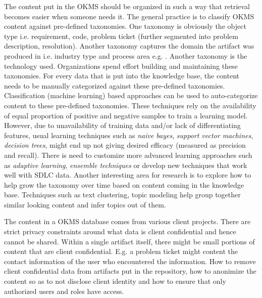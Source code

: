 The content put in the OKMS should be organized in such a way that retrieval becomes easier when someone needs it. The general practice is to classify OKMS content against pre-defined taxonomies. One taxonomy is obviously the object type i.e. requirement, code, problem ticket (further segmented into problem description, resolution). Another taxonomy captures the domain the artifact was produced in i.e. industry type and process area e.g. \cite{}. Another taxonomy is the technology used. Organizations spend effort building and maintaining these taxonomies. For every data that is put into the knowledge base, the content needs to be manually categorized against these pre-defined taxonomies. Classification (machine learning) based approaches can be used to auto-categorize content to these pre-defined taxonomies. These techniques rely on the availability of equal proportion of positive and negative samples to train a learning model. However, due to unavailability of training data and/or lack of differentiating features, usual learning techniques such as \textit{naive bayes}, \textit{support vector machines}, \textit{decision trees}, might end up not giving desired efficacy (measured as precision and recall). There is need to customize more advanced learning approaches such as \textit{adaptive learning}, \textit{ensemble techniques} or develop new techniques that work well with SDLC data. Another interesting area for research is to explore how to help grow the taxonomy over time based on content coming in the knowledge base. Techniques such as text clustering, topic modeling \cite{} help group together similar looking content and infer topics out of them. 

The content in a OKMS database comes from various client projects. There are strict privacy constraints around what data is client confidential and hence cannot be shared. Within a single artifact itself, there might be small portions of content that are client confidential. E.g. a problem ticket might content the contact information of the user who encountered the information. How to remove client confidential data from artifacts put in the repository, how to anonimize the content so as to not disclose client identity and how to ensure that only authorized users and roles have access.


